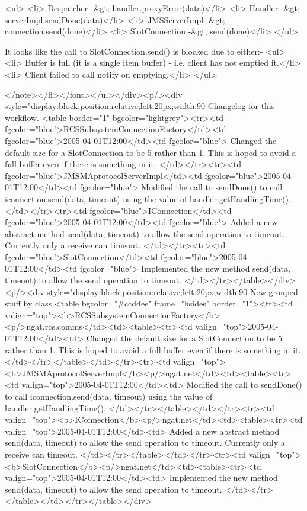 	<ul>
	  <li> Despatcher     -&gt; handler.proxyError(data)</li>
	  <li> Handler        -&gt; serverImpl.sendDone(data)</li>
	  <li> JMSServerImpl  -&gt; connection.send(done)</li>
	  <li> SlotConnection -&gt; send(done)</li>
	</ul>

	It looks like the call to SlotConnection.send() is blocked due to either:-
	<ul>
	  <li> Buffer is full (it is a single item buffer) - i.e. client has not emptied it.</li>
	  <li> Client failed to call notify on emptying.</li>
	</ul>

      </note></li></font></ul></div><p/><div style="display:block;position:relative;left:20px;width:90%
      Changelog for this workflow.
      <table border="1" bgcolor="lightgrey"><tr><td fgcolor="blue">RCSSubsystemConnectionFactory</td><td fgcolor="blue">2005-04-01T12:00</td><td fgcolor="blue">
	    Changed the default size for a SlotConnection to be 5 rather than 1.
	    This is hoped to avoid a full buffer even if there is something in it.
	  </td></tr><tr><td fgcolor="blue">JMSMAprotocolServerImpl</td><td fgcolor="blue">2005-04-01T12:00</td><td fgcolor="blue">
	    Modified the call to sendDone() to call iconnection.send(data, timeout)
	    using the value of handler.getHandlingTime().
	  </td></tr><tr><td fgcolor="blue">IConnection</td><td fgcolor="blue">2005-04-01T12:00</td><td fgcolor="blue">
	    Added a new abstract method send(data, timeout) to allow the send operation
	    to timeout. Currently only a receive can timeout.
	  </td></tr><tr><td fgcolor="blue">SlotConnection</td><td fgcolor="blue">2005-04-01T12:00</td><td fgcolor="blue">
	    Implemented the  new method send(data, timeout) to allow the send operation
	    to timeout.
	  </td></tr></table></div><p/><div style="display:block;position:relative;left:20px;width:90%
     New grouped stuff by class
     <table bgcolor="#ccddee" frame="hsides" border="1"><tr><td valign="top"><b>RCSSubsystemConnectionFactory</b><p/>ngat.rcs.comms</td><td><table><tr><td valign="top">2005-04-01T12:00</td><td>
	    Changed the default size for a SlotConnection to be 5 rather than 1.
	    This is hoped to avoid a full buffer even if there is something in it.
	  </td></tr></table></td></tr><tr><td valign="top"><b>JMSMAprotocolServerImpl</b><p/>ngat.net</td><td><table><tr><td valign="top">2005-04-01T12:00</td><td>
	    Modified the call to sendDone() to call iconnection.send(data, timeout)
	    using the value of handler.getHandlingTime().
	  </td></tr></table></td></tr><tr><td valign="top"><b>IConnection</b><p/>ngat.net</td><td><table><tr><td valign="top">2005-04-01T12:00</td><td>
	    Added a new abstract method send(data, timeout) to allow the send operation
	    to timeout. Currently only a receive can timeout.
	  </td></tr></table></td></tr><tr><td valign="top"><b>SlotConnection</b><p/>ngat.net</td><td><table><tr><td valign="top">2005-04-01T12:00</td><td>
	    Implemented the  new method send(data, timeout) to allow the send operation
	    to timeout.
	  </td></tr></table></td></tr></table></div>

